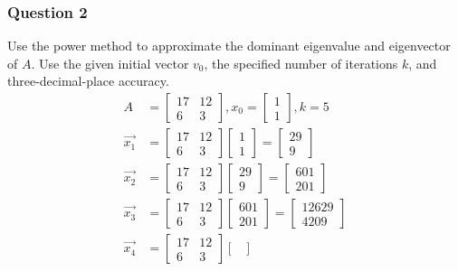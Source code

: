 \documentclass{math}
\begin{document}
\subsubsection*{Question 2}
Use the power method to approximate the dominant eigenvalue and eigenvector of
\( A \). Use the given initial vector \( v_0 \), the specified number of
iterations \( k \), and three-decimal-place accuracy.
\begin{align*}
  A &= \begin{bmatrix}17 & 12 \\ 6 & 3\end{bmatrix}, x_0 = \begin{bmatrix}
    1 \\ 1\end{bmatrix}, k = 5 \\
  \vec{x_1} &= \begin{bmatrix}17 & 12 \\ 6 & 3\end{bmatrix}\begin{bmatrix}
    1 \\ 1\end{bmatrix} = \begin{bmatrix}29 \\ 9\end{bmatrix} \\
  \vec{x_2} &= \begin{bmatrix}17 & 12 \\ 6 & 3\end{bmatrix}\begin{bmatrix}
    29 \\ 9\end{bmatrix} = \begin{bmatrix}601 \\ 201\end{bmatrix} \\
  \vec{x_3} &= \begin{bmatrix}17 & 12 \\ 6 & 3\end{bmatrix}\begin{bmatrix}
    601 \\ 201\end{bmatrix} = \begin{bmatrix}12629 \\ 4209\end{bmatrix} \\
  \vec{x_4} &= \begin{bmatrix}17 & 12 \\ 6 & 3\end{bmatrix}\begin{bmatrix}

\end{bmatrix}
\end{align*}
\end{document}

